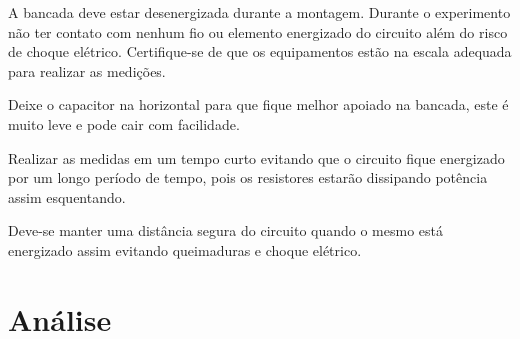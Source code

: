 \documentclass[a4paper, 12pt]{article}
\begin{document}
		A bancada deve estar desenergizada durante a montagem. Durante o experimento não ter contato com nenhum fio ou elemento energizado do circuito além do risco de choque elétrico. Certifique-se de que os equipamentos estão na escala adequada para realizar as medições.
		
		Deixe o capacitor na horizontal para que
		fique melhor apoiado na bancada, este é muito leve e pode cair com facilidade.
		
		Realizar as medidas em um tempo curto evitando que o circuito fique energizado por um longo período de tempo, pois os resistores estarão dissipando potência assim esquentando.
		
		Deve-se manter uma distância segura do circuito quando o mesmo está energizado assim evitando queimaduras e choque elétrico.
		
		\newpage
		\section{Análise}
		\justifying
\end{document}

